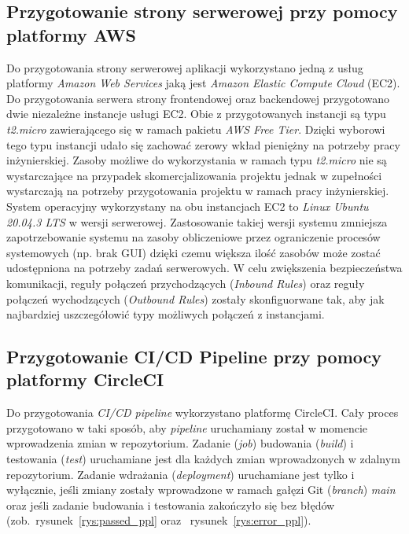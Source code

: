 	\subsection{Przygotowanie strony serwerowej przy pomocy platformy AWS}
	Do przygotowania strony serwerowej aplikacji wykorzystano jedną z usług platformy \textit{Amazon Web Services} jaką jest \textit{Amazon Elastic Compute Cloud} (EC2). Do przygotowania serwera strony frontendowej oraz backendowej przygotowano dwie niezależne instancje usługi EC2. Obie z przygotowanych instancji są typu \textit{t2.micro} zawierającego się w ramach pakietu \textit{AWS Free Tier}. Dzięki wyborowi tego typu instancji udało się zachować zerowy wkład pieniężny na potrzeby pracy inżynierskiej. Zasoby możliwe do wykorzystania w ramach typu \textit{t2.micro} nie są wystarczające na przypadek skomercjalizowania projektu jednak w zupełności wystarczają na potrzeby przygotowania projektu w ramach pracy inżynierskiej.
System operacyjny wykorzystany na obu instancjach EC2 to \textit{Linux Ubuntu 20.04.3 LTS} w wersji serwerowej. Zastosowanie takiej wersji systemu zmniejsza zapotrzebowanie systemu na zasoby obliczeniowe przez ograniczenie procesów systemowych (np. brak GUI) dzięki czemu większa ilość zasobów może zostać udostępniona na potrzeby zadań serwerowych. W celu zwiększenia bezpieczeństwa komunikacji, reguły połączeń przychodzących (\textit{Inbound Rules}) oraz reguły połączeń wychodzących (\textit{Outbound Rules}) zostały skonfiguorwane tak, aby jak najbardziej uszczegółowić typy możliwych połączeń z instancjami.
	
	\subsection{Przygotowanie CI/CD Pipeline przy pomocy platformy CircleCI}
	Do przygotowania \textit{CI/CD pipeline} wykorzystano platformę CircleCI. Cały proces przygotowano w taki sposób, aby \textit{pipeline} uruchamiany został w momencie wprowadzenia zmian w repozytorium. Zadanie (\textit{job}) budowania (\textit{build}) i testowania (\textit{test}) uruchamiane jest dla każdych zmian wprowadzonych w zdalnym repozytorium. Zadanie wdrażania (\textit{deployment}) uruchamiane jest tylko i wyłącznie, jeśli zmiany zostały wprowadzone w ramach gałęzi Git (\textit{branch}) \textit{main} oraz jeśli zadanie budowania i testowania zakończyło się bez błędów (zob.~rysunek~\ref{rys:passed_ppl} oraz ~rysunek~\ref{rys:error_ppl}).

